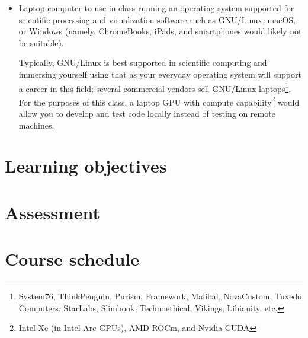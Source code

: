 \documentclass[12pt]{article}
\begin{document}
\begin{itemize}
\item Laptop computer to use in class running an operating system %
  supported for scientific processing and visualization software %
  such as GNU/Linux, macOS, or Windows %
  (namely, ChromeBooks, iPads, and smartphones would likely not be suitable).

  Typically, %
  GNU/Linux is best supported in scientific computing %
  and immersing yourself using that as your everyday operating system %
  will support a career in this field; %
  several commercial vendors sell GNU/Linux laptops\footnote{%
  System76, ThinkPenguin, Purism, %
  Framework, Malibal, %
  NovaCustom, Tuxedo Computers, StarLabs, Slimbook, %
  Technoethical, Vikings, Libiquity, etc.}.
  For the purposes of this class, %
  a laptop GPU with compute capability\footnote{%
  Intel Xe (in Intel Arc GPUs), AMD ROCm, and Nvidia CUDA} %
  would allow you to develop and test code locally %
  instead of testing on remote machines.
\end{itemize}

\section{Learning objectives}

\section{Assessment}

\section{Course schedule}
\end{document}
